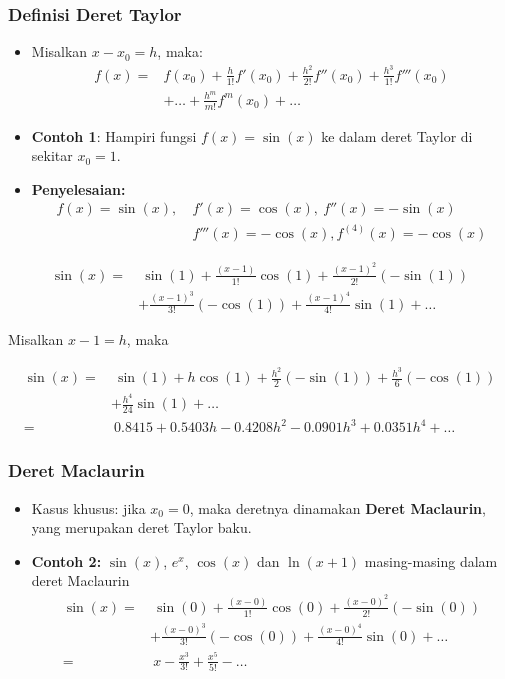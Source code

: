 \documentclass[pdflatex,compress]{beamer}
\begin{document}
\begin{frame}
	\frametitle{Definisi Deret Taylor}
	\begin{itemize}
		\item Misalkan $ x - x_0 = h $, maka:
		\begin{align*}
			f(x) =& f(x_0) + \frac{h}{1!}f'(x_0) + \frac{h^2}{2!}f''(x_0) + \frac{h^3}{1!}f'''(x_0) \\
			&+ \dots + \frac{h^m}{m!}f^m(x_0) + \dots
		\end{align*}
		\item \textbf{Contoh 1}: Hampiri fungsi $ f(x) = \sin(x) $ ke dalam deret Taylor di sekitar $ x_0 = 1 $.
		\item \textbf{Penyelesaian:}
			\begin{align*}
				f(x) = \sin(x),~ &f'(x) = \cos(x),~f''(x) = -\sin(x) \\
				&f'''(x) = -\cos(x), f^{(4)}(x) = -\cos(x)
			\end{align*}
	\end{itemize}
\end{frame}

\begin{frame}
	\begin{align*}
		\sin(x) =&~ \sin(1) + \frac{(x-1)}{1!}\cos(1) + \frac{(x-1)^2}{2!}(-\sin(1)) \\
		& + \frac{(x-1)^3}{3!}(-\cos(1)) + \frac{(x-1)^4}{4!}\sin(1) + \dots
	\end{align*}

	Misalkan $ x - 1 = h $, maka
	
	\begin{align*}
		\sin(x) =&~ \sin(1) + h\cos(1) + \frac{h^2}{2}(-\sin(1)) + \frac{h^3}{6}(-\cos(1)) \\
		&+ \frac{h^4}{24}\sin(1) + \dots \\
		=&~ 0.8415 + 0.5403h - 0.4208h^2 - 0.0901h^3 + 0.0351h^4 + \dots
	\end{align*}
\end{frame}

\begin{frame}
	\frametitle{Deret Maclaurin}
	\begin{itemize}
		\item Kasus khusus: jika $ x_0 = 0$, maka deretnya dinamakan \textbf{Deret Maclaurin}, yang merupakan deret Taylor baku.
		\item \textbf{Contoh 2:} $ \sin(x) $, $ e^x $, $ \cos(x) $ dan $ \ln(x+1) $ masing-masing dalam deret Maclaurin
		\begin{align*}
			\sin(x) =&~ \sin(0) + \frac{(x-0)}{1!}\cos(0) + \frac{(x-0)^2}{2!}(-\sin(0)) \\
			& + \frac{(x-0)^3}{3!}(-\cos(0)) + \frac{(x-0)^4}{4!}\sin(0) + \dots \\
			=&~ x - \frac{x^3}{3!} + \frac{x^5}{5!} - \dots
		\end{align*}
	\end{itemize}
\end{frame}
\end{document}
